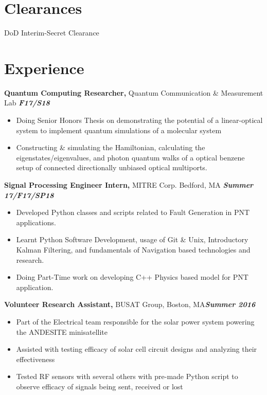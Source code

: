 \documentclass[margin]{res}
\begin{document}
\begin{resume}
 
\section{Clearances}
DoD Interim-Secret Clearance 

\section{Experience}
{\bf Quantum Computing Researcher,} Quantum Communication \& Measurement Lab \hfill  \textbf{\textit{F17/S18}}
\begin{itemize}  pt
\item Doing Senior Honors Thesis on demonstrating the potential of a linear-optical system to implement quantum simulations of a molecular system
\item Constructing \& simulating the Hamiltonian, calculating the eigenstates/eigenvalues, and photon quantum walks of a optical benzene setup of connected directionally unbiased optical multiports.
\end{itemize}



 {\bf Signal Processing Engineer Intern,} MITRE Corp. Bedford, MA \hfill \textbf{\textit{Summer 17/F17/SP18}}
 \begin{itemize}  pt  %
 \item Developed Python classes and scripts related to Fault Generation in PNT applications.
 \item Learnt Python Software Development, usage of Git \& Unix, Introductory Kalman Filtering, and fundamentals of Navigation based technologies and research.
 \item Doing Part-Time work on developing C++ Physics based model for PNT application. 
 \end{itemize}

 
 
{\bf Volunteer Research Assistant,} BUSAT Group, Boston, MA\hfill  \textbf{\textit{Summer 2016}}
\begin{itemize} \itemsep -0.1pt %
\item Part of the Electrical team responsible for the solar power system powering the ANDESITE minisatellite
\item Assisted with testing efficacy of solar cell circuit designs and analyzing their effectiveness 
\item Tested RF sensors with several others with pre-made Python script to observe efficacy of signals being sent, received or lost
\end{itemize}



\end{resume}
\end{document}
